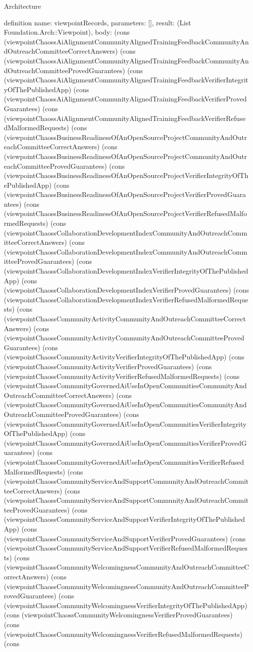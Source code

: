 \begin{lexlean}{Architecture}
\begin{semanticmodule}
definition{
  name: viewpointRecords,
  parameters: [],
  result: (List Foundation.Arch::Viewpoint),
  body: (cons (viewpointChaossAiAlignmentCommunityAlignedTrainingFeedbackCommunityAndOutreachCommitteeCorrectAnswers) (cons (viewpointChaossAiAlignmentCommunityAlignedTrainingFeedbackCommunityAndOutreachCommitteeProvedGuarantees) (cons (viewpointChaossAiAlignmentCommunityAlignedTrainingFeedbackVerifierIntegrityOfThePublishedApp) (cons (viewpointChaossAiAlignmentCommunityAlignedTrainingFeedbackVerifierProvedGuarantees) (cons (viewpointChaossAiAlignmentCommunityAlignedTrainingFeedbackVerifierRefusedMalformedRequests) (cons (viewpointChaossBusinessReadinessOfAnOpenSourceProjectCommunityAndOutreachCommitteeCorrectAnswers) (cons (viewpointChaossBusinessReadinessOfAnOpenSourceProjectCommunityAndOutreachCommitteeProvedGuarantees) (cons (viewpointChaossBusinessReadinessOfAnOpenSourceProjectVerifierIntegrityOfThePublishedApp) (cons (viewpointChaossBusinessReadinessOfAnOpenSourceProjectVerifierProvedGuarantees) (cons (viewpointChaossBusinessReadinessOfAnOpenSourceProjectVerifierRefusedMalformedRequests) (cons (viewpointChaossCollaborationDevelopmentIndexCommunityAndOutreachCommitteeCorrectAnswers) (cons (viewpointChaossCollaborationDevelopmentIndexCommunityAndOutreachCommitteeProvedGuarantees) (cons (viewpointChaossCollaborationDevelopmentIndexVerifierIntegrityOfThePublishedApp) (cons (viewpointChaossCollaborationDevelopmentIndexVerifierProvedGuarantees) (cons (viewpointChaossCollaborationDevelopmentIndexVerifierRefusedMalformedRequests) (cons (viewpointChaossCommunityActivityCommunityAndOutreachCommitteeCorrectAnswers) (cons (viewpointChaossCommunityActivityCommunityAndOutreachCommitteeProvedGuarantees) (cons (viewpointChaossCommunityActivityVerifierIntegrityOfThePublishedApp) (cons (viewpointChaossCommunityActivityVerifierProvedGuarantees) (cons (viewpointChaossCommunityActivityVerifierRefusedMalformedRequests) (cons (viewpointChaossCommunityGovernedAiUseInOpenCommunitiesCommunityAndOutreachCommitteeCorrectAnswers) (cons (viewpointChaossCommunityGovernedAiUseInOpenCommunitiesCommunityAndOutreachCommitteeProvedGuarantees) (cons (viewpointChaossCommunityGovernedAiUseInOpenCommunitiesVerifierIntegrityOfThePublishedApp) (cons (viewpointChaossCommunityGovernedAiUseInOpenCommunitiesVerifierProvedGuarantees) (cons (viewpointChaossCommunityGovernedAiUseInOpenCommunitiesVerifierRefusedMalformedRequests) (cons (viewpointChaossCommunityServiceAndSupportCommunityAndOutreachCommitteeCorrectAnswers) (cons (viewpointChaossCommunityServiceAndSupportCommunityAndOutreachCommitteeProvedGuarantees) (cons (viewpointChaossCommunityServiceAndSupportVerifierIntegrityOfThePublishedApp) (cons (viewpointChaossCommunityServiceAndSupportVerifierProvedGuarantees) (cons (viewpointChaossCommunityServiceAndSupportVerifierRefusedMalformedRequests) (cons (viewpointChaossCommunityWelcomingnessCommunityAndOutreachCommitteeCorrectAnswers) (cons (viewpointChaossCommunityWelcomingnessCommunityAndOutreachCommitteeProvedGuarantees) (cons (viewpointChaossCommunityWelcomingnessVerifierIntegrityOfThePublishedApp) (cons (viewpointChaossCommunityWelcomingnessVerifierProvedGuarantees) (cons (viewpointChaossCommunityWelcomingnessVerifierRefusedMalformedRequests) (cons }
\end{semanticmodule}
\end{lexlean}
